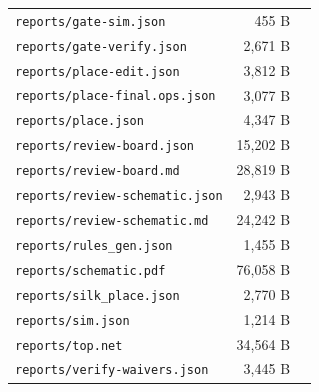 \documentclass[11pt,a4paper]{article}
\begin{document}
{\begin{longtable}{p{9cm}rp{4cm}}
\texttt{reports/gate-sim.json} & 455 B &  \\
\texttt{reports/gate-verify.json} & 2,671 B &  \\
\texttt{reports/place-edit.json} & 3,812 B &  \\
\texttt{reports/place-final.ops.json} & 3,077 B &  \\
\texttt{reports/place.json} & 4,347 B &  \\
\texttt{reports/review-board.json} & 15,202 B &  \\
\texttt{reports/review-board.md} & 28,819 B &  \\
\texttt{reports/review-schematic.json} & 2,943 B &  \\
\texttt{reports/review-schematic.md} & 24,242 B &  \\
\texttt{reports/rules\_gen.json} & 1,455 B &  \\
\texttt{reports/schematic.pdf} & 76,058 B &  \\
\texttt{reports/silk\_place.json} & 2,770 B &  \\
\texttt{reports/sim.json} & 1,214 B &  \\
\texttt{reports/top.net} & 34,564 B &  \\
\texttt{reports/verify-waivers.json} & 3,445 B &  \\
\bottomrule
\end{longtable}
}
\end{document}
